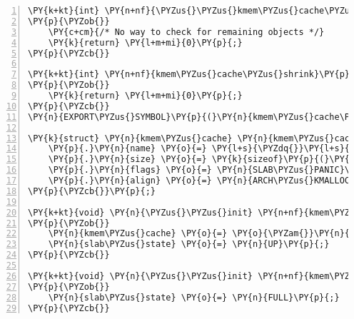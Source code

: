 \begin{Verbatim}[commandchars=\\\{\},numbers=left,firstnumber=1,stepnumber=1]
\PY{k+kt}{int} \PY{n+nf}{\PYZus{}\PYZus{}kmem\PYZus{}cache\PYZus{}shutdown}\PY{p}{(}\PY{k}{struct} \PY{n}{kmem\PYZus{}cache} \PY{o}{*}\PY{n}{c}\PY{p}{)}
\PY{p}{\PYZob{}}
	\PY{c+cm}{/* No way to check for remaining objects */}
	\PY{k}{return} \PY{l+m+mi}{0}\PY{p}{;}
\PY{p}{\PYZcb{}}

\PY{k+kt}{int} \PY{n+nf}{kmem\PYZus{}cache\PYZus{}shrink}\PY{p}{(}\PY{k}{struct} \PY{n}{kmem\PYZus{}cache} \PY{o}{*}\PY{n}{d}\PY{p}{)}
\PY{p}{\PYZob{}}
	\PY{k}{return} \PY{l+m+mi}{0}\PY{p}{;}
\PY{p}{\PYZcb{}}
\PY{n}{EXPORT\PYZus{}SYMBOL}\PY{p}{(}\PY{n}{kmem\PYZus{}cache\PYZus{}shrink}\PY{p}{)}\PY{p}{;}

\PY{k}{struct} \PY{n}{kmem\PYZus{}cache} \PY{n}{kmem\PYZus{}cache\PYZus{}boot} \PY{o}{=} \PY{p}{\PYZob{}}
	\PY{p}{.}\PY{n}{name} \PY{o}{=} \PY{l+s}{\PYZdq{}}\PY{l+s}{kmem\PYZus{}cache}\PY{l+s}{\PYZdq{}}\PY{p}{,}
	\PY{p}{.}\PY{n}{size} \PY{o}{=} \PY{k}{sizeof}\PY{p}{(}\PY{k}{struct} \PY{n}{kmem\PYZus{}cache}\PY{p}{)}\PY{p}{,}
	\PY{p}{.}\PY{n}{flags} \PY{o}{=} \PY{n}{SLAB\PYZus{}PANIC}\PY{p}{,}
	\PY{p}{.}\PY{n}{align} \PY{o}{=} \PY{n}{ARCH\PYZus{}KMALLOC\PYZus{}MINALIGN}\PY{p}{,}
\PY{p}{\PYZcb{}}\PY{p}{;}

\PY{k+kt}{void} \PY{n}{\PYZus{}\PYZus{}init} \PY{n+nf}{kmem\PYZus{}cache\PYZus{}init}\PY{p}{(}\PY{k+kt}{void}\PY{p}{)}
\PY{p}{\PYZob{}}
	\PY{n}{kmem\PYZus{}cache} \PY{o}{=} \PY{o}{\PYZam{}}\PY{n}{kmem\PYZus{}cache\PYZus{}boot}\PY{p}{;}
	\PY{n}{slab\PYZus{}state} \PY{o}{=} \PY{n}{UP}\PY{p}{;}
\PY{p}{\PYZcb{}}

\PY{k+kt}{void} \PY{n}{\PYZus{}\PYZus{}init} \PY{n+nf}{kmem\PYZus{}cache\PYZus{}init\PYZus{}late}\PY{p}{(}\PY{k+kt}{void}\PY{p}{)}
\PY{p}{\PYZob{}}
	\PY{n}{slab\PYZus{}state} \PY{o}{=} \PY{n}{FULL}\PY{p}{;}
\PY{p}{\PYZcb{}}
\end{Verbatim}
